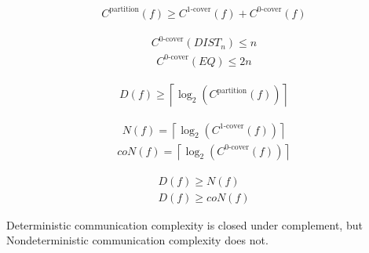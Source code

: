 \begin{observe}
    \begin{align*}
        C^{\text{partition}}(f) \ge C^{\text{1-cover}}(f) + C^{\text{0-cover}}(f)
    \end{align*}
\end{observe}

\begin{remark}
    \begin{align*}
        C^{\text{0-cover}}(DIST_n) \le n
    \end{align*}
    \begin{align*}
        C^{\text{0-cover}}(EQ) \le 2n
    \end{align*}
\end{remark}

\begin{previouslyseen}
    \begin{align*}
        D(f) \ge \left\lceil \log_2(C^{\text{partition}}(f)) \right\rceil 
    \end{align*}
\end{previouslyseen}

\begin{theorem}
    \begin{align*}
        N(f) = \left\lceil \log_2(C^{\text{1-cover}}(f)) \right\rceil 
    \end{align*}
    \begin{align*}
        coN(f) = \left\lceil \log_2(C^{\text{0-cover}}(f)) \right\rceil 
    \end{align*}
\end{theorem}

\begin{corollary}
\begin{align*}
    D(f) \ge N(f)
    \\ D(f) \ge coN(f)
\end{align*}
\end{corollary}

\begin{observe}
    Deterministic communication complexity is closed under complement, but Nondeterministic communication complexity does not.
\end{observe}

